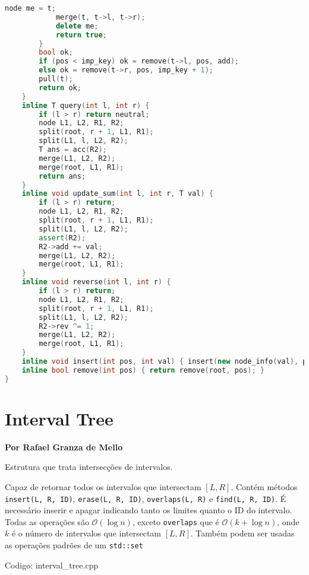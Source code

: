 \documentclass[10pt, a4paper, oneside]{book}
\begin{document}
\begin{lstlisting}[language=C++]
            node me = t;
            merge(t, t->l, t->r);
            delete me;
            return true;
        }
        bool ok;
        if (pos < imp_key) ok = remove(t->l, pos, add);
        else ok = remove(t->r, pos, imp_key + 1);
        pull(t);
        return ok;
    }
    inline T query(int l, int r) {
        if (l > r) return neutral;
        node L1, L2, R1, R2;
        split(root, r + 1, L1, R1);
        split(L1, l, L2, R2);
        T ans = acc(R2);
        merge(L1, L2, R2);
        merge(root, L1, R1);
        return ans;
    }
    inline void update_sum(int l, int r, T val) {
        if (l > r) return;
        node L1, L2, R1, R2;
        split(root, r + 1, L1, R1);
        split(L1, l, L2, R2);
        assert(R2);
        R2->add += val;
        merge(L1, L2, R2);
        merge(root, L1, R1);
    }
    inline void reverse(int l, int r) {
        if (l > r) return;
        node L1, L2, R1, R2;
        split(root, r + 1, L1, R1);
        split(L1, l, L2, R2);
        R2->rev ^= 1;
        merge(L1, L2, R2);
        merge(root, L1, R1);
    }
    inline void insert(int pos, int val) { insert(new node_info(val), pos); }
    inline bool remove(int pos) { return remove(root, pos); }
}
\end{lstlisting}
\hfill

\section{Interval Tree}


\textbf{Por Rafael Granza de Mello}



Estrutura que trata intersecções de intervalos.



Capaz de retornar todos os intervalos que intersectam $[L, R]$. Contém métodos \texttt{insert({L, R, ID})}, \texttt{erase({L, R, ID})}, \texttt{overlaps(L, R)} e \texttt{find({L, R, ID})}. É necessário inserir e apagar indicando tanto os limites quanto o ID do intervalo. Todas as operações são $\mathcal{O}(\log n)$, exceto \texttt{overlaps} que é $\mathcal{O}(k + \log n)$, onde $k$ é o número de intervalos que intersectam $[L, R]$. Também podem ser usadas as operações padrões de um \texttt{std::set}

\hfill

Codigo: interval\_tree.cpp
\end{document}
